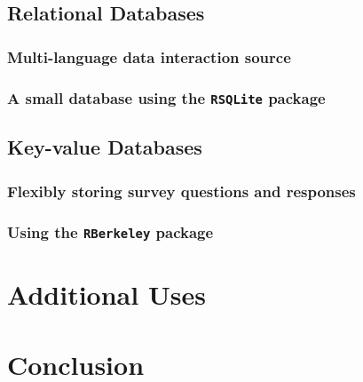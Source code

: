 \documentclass[]{article}
\begin{document}
\subsection{Relational Databases}

\subsubsection{Multi-language data interaction source}

\citep{Fredrickson:2010fk}

\subsubsection{A small database using the \texttt{RSQLite} package}

\subsection{Key-value Databases}

\subsubsection{Flexibly storing survey questions and responses}

\subsubsection{Using the \texttt{RBerkeley} package}

\section{Additional Uses}
\label{sec:additionaluses}


\section{Conclusion}



\end{document}
